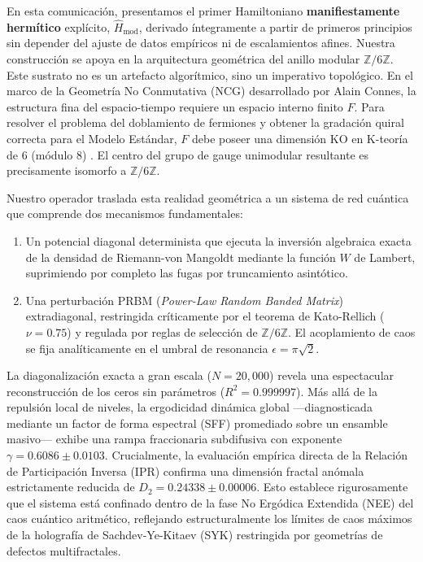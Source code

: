 \documentclass[aps,prl,preprint,superscriptaddress,floatfix]{revtex4-2}
\newcommand{\Zmod}{\mathbb{Z}/6\mathbb{Z}}
\begin{document}
En esta comunicación, presentamos el primer Hamiltoniano \textbf{manifiestamente hermítico} explícito, $\hat{H}_{\text{mod}}$, derivado íntegramente a partir de primeros principios sin depender del ajuste de datos empíricos ni de escalamientos afines. Nuestra construcción se apoya en la arquitectura geométrica del anillo modular $\mathbb{Z}/6\mathbb{Z}$. Este sustrato no es un artefacto algorítmico, sino un imperativo topológico. En el marco de la Geometría No Conmutativa (NCG) desarrollado por Alain Connes, la estructura fina del espacio-tiempo requiere un espacio interno finito $F$. Para resolver el problema del doblamiento de fermiones y obtener la gradación quiral correcta para el Modelo Estándar, $F$ debe poseer una dimensión KO en K-teoría de 6 (módulo 8) \cite{Connes2008, Chamseddine2007, ConnesConsani2021}. El centro del grupo de gauge unimodular resultante es precisamente isomorfo a $\Zmod$.

Nuestro operador traslada esta realidad geométrica a un sistema de red cuántica que comprende dos mecanismos fundamentales:
\begin{enumerate}
    \item Un potencial diagonal determinista que ejecuta la inversión algebraica exacta de la densidad de Riemann-von Mangoldt mediante la función $W$ de Lambert, suprimiendo por completo las fugas por truncamiento asintótico.
    \item Una perturbación PRBM (\textit{Power-Law Random Banded Matrix}) extradiagonal, restringida críticamente por el teorema de Kato-Rellich ($\nu = 0.75$) y regulada por reglas de selección de $\Zmod$. El acoplamiento de caos se fija analíticamente en el umbral de resonancia $\epsilon = \pi\sqrt{2}$.
\end{enumerate}

La diagonalización exacta a gran escala ($N=20,000$) revela una espectacular reconstrucción de los ceros sin parámetros ($R^2 = 0.999997$). Más allá de la repulsión local de niveles, la ergodicidad dinámica global —diagnosticada mediante un factor de forma espectral (SFF) promediado sobre un ensamble masivo— exhibe una rampa fraccionaria subdifusiva con exponente $\gamma = 0.6086 \pm 0.0103$. Crucialmente, la evaluación empírica directa de la Relación de Participación Inversa (IPR) confirma una dimensión fractal anómala estrictamente reducida de $D_2 = 0.24338 \pm 0.00006$. Esto establece rigurosamente que el sistema está confinado dentro de la fase No Ergódica Extendida (NEE) del caos cuántico aritmético, reflejando estructuralmente los límites de caos máximos de la holografía de Sachdev-Ye-Kitaev (SYK) restringida por geometrías de defectos multifractales.
\end{document}
